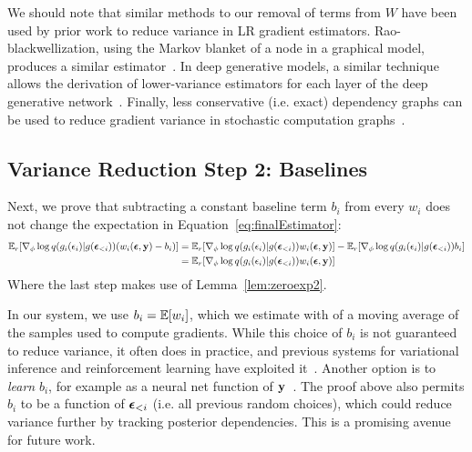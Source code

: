 We should note that similar methods to our removal of terms from $W$ have been used by prior work to reduce variance in LR gradient estimators. Rao-blackwellization, using the Markov blanket of a node in a graphical model, produces a similar estimator~\cite{BBVI}. In deep generative models, a similar technique allows the derivation of lower-variance estimators for each layer of the deep generative network~\cite{NVIL}. Finally, less conservative (i.e. exact) dependency graphs can be used to reduce gradient variance in stochastic computation graphs~\cite{StochasticComputationGraphs}.

\subsection{Variance Reduction Step 2: Baselines}

Next, we prove that subtracting a constant baseline term $b_i$ from every $w_i$ does not change the expectation in Equation~\ref{eq:finalEstimator}:
\begin{align*}
\expect_\reparamDist [ \gradparams \log \guide(\reparamXform_i(\reparamVar_i) | \reparamXform(\reparamVars_{<i})) (w_i(\reparamVars, \observedVars) - b_i) ]
%
&= \expect_\reparamDist [ \gradparams \log \guide(\reparamXform_i(\reparamVar_i) | \reparamXform(\reparamVars_{<i})) w_i(\reparamVars, \observedVars) ] - \expect_\reparamDist[ \gradparams \log \guide(\reparamXform_i(\reparamVar_i) | \reparamXform(\reparamVars_{<i})) b_i ]\\
%
&= \expect_\reparamDist [ \gradparams \log \guide(\reparamXform_i(\reparamVar_i) | \reparamXform(\reparamVars_{<i})) w_i(\reparamVars, \observedVars) ] 
\end{align*}
Where the last step makes use of Lemma~\ref{lem:zeroexp2}.

In our system, we use $b_i = \mathbb{E}[ w_i ]$, which we estimate with of a moving average of the samples used to compute gradients. While this choice of $b_i$ is not guaranteed to reduce variance, it often does in practice, and previous systems for variational inference and reinforcement learning have exploited it~\cite{BBVI,StochasticComputationGraphs,VarianceReduction}. Another option is to \emph{learn} $b_i$, for example as a neural net function of $\mathbf{y}$~\cite{NVIL}. The proof above also permits $b_i$ to be a function of $\bm{\epsilon}_{<i}$ (i.e. all previous random choices), which could reduce variance further by tracking posterior dependencies. This is a promising avenue for future work.

